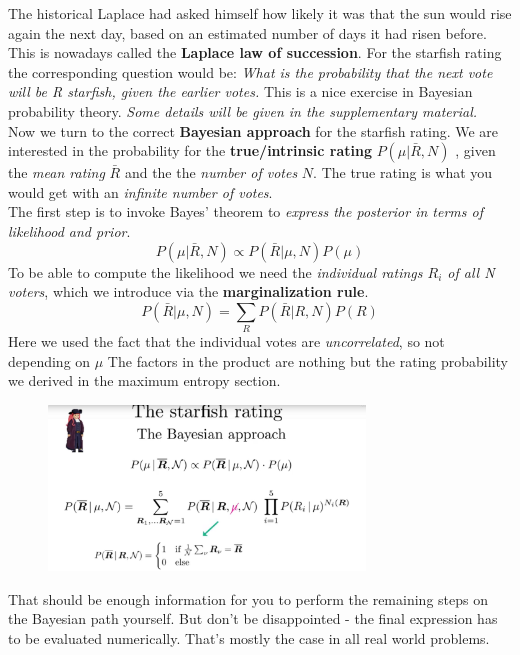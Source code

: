 \documentclass[12pt, a4paper]{scrartcl}
\begin{document}
The historical Laplace had asked himself how likely it was that the sun would
rise again the next day, based on an estimated number of days it had risen
before. This is nowadays called the \textbf{Laplace law of succession}.
For the starﬁsh rating the corresponding question would be: \textit{What is the
probability that the next vote will be R starﬁsh, given the earlier votes.} This
is a nice exercise in Bayesian probability theory. \textit{Some details will be given
in the supplementary material.}\\


Now we turn to the correct \textbf{Bayesian approach} for the starﬁsh rating. We
are interested in the probability for the \textbf{true/intrinsic rating} $P(\mu|\bar{R},N)$ , given the \textit{mean rating} $\bar{R}$ and the the \textit{number
of votes} $N$. The true rating is what you would get with an \textit{inﬁnite number of votes}.\\

The ﬁrst step is to invoke Bayes’ theorem to \textit{express the posterior in terms of likelihood and prior}.
\[P(\mu|\bar{R},N)\propto P(\bar{R}|\mu,N)P(\mu)\]
To be able to
compute the likelihood we need the \textit{individual ratings $R_i$ of all N voters},
which we introduce via the \textbf{marginalization rule}.
\[P(\bar{R}|\mu,N)=\sum_RP(\bar{R}|R,N)P(R)\]
 Here we used the fact that the individual votes are \textit{uncorrelated}, so not depending on $\mu$
The factors in the product are nothing but the rating probability we derived
in the maximum entropy section.\\%
 \begin{figure}[H]
	\centering
	\includegraphics[width=0.75\textwidth]{6_10.png}
\end{figure}

That should be enough information for you to perform the remaining steps on
the Bayesian path yourself. But don’t be disappointed - the ﬁnal expression
has to be evaluated numerically. That’s mostly the case in all real world
problems.\\%
\end{document}
